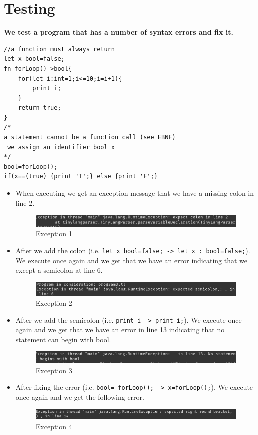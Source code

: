 \section{Testing}
\textbf{We test a program that has a number of  syntax errors and fix it.}
\begin{lstlisting}[basicstyle=\tiny,caption=Program 3]
//a function must always return
let x bool=false;
fn forLoop()->bool{
	for(let i:int=1;i<=10;i=i+1){
		print i;
	}
	return true;
}
/*
a statement cannot be a function call (see EBNF)
 we assign an identifier bool x
*/
bool=forLoop();
if(x==(true) {print 'T';} else {print 'F';}
\end{lstlisting}
\begin{itemize}
    \item When executing we get an exception message that we have a missing colon in line 2.
    \begin{figure}[H]
        \centering
        \includegraphics[scale=0.6]{Task2/image/error1.png}
        \caption{Exception 1}
        \label{fig:Exception 1}
    \end{figure}
    
    \item After we add the colon (i.e.
    \verb!let x bool=false; -> let x : bool=false;!). We execute once again and we get that we have an error indicating that we except a semicolon at line 6.
        \begin{figure}[H]
        \centering
        \includegraphics[scale=0.6]{Task2/image/error2.png}
        \caption{Exception 2}
        \label{fig:Exception 2}
    \end{figure}
    
    \item After we add the semicolon (i.e.
    \verb!print i -> print i;!). We execute once again and we get that we have an error in line 13 indicating that no statement can begin with bool.
            \begin{figure}[H]
        \centering
        \includegraphics[scale=0.8]{Task2/image/error3.png}
        \caption{Exception 3}
        \label{fig:Exception 3}
    \end{figure}
        \item After fixing the error (i.e.
    \verb!bool=-forLoop(); -> x=forLoop();!). We execute once again and we get the following error.
                \begin{figure}[H]
        \centering
        \includegraphics[scale=0.8]{Task2/image/error4.png}
        \caption{Exception 4}
        \label{fig:Exception 4}
    \end{figure}
    

\end{itemize}
